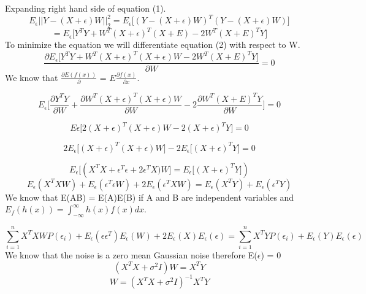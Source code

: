 \documentclass{article}
\begin{document}
Expanding right hand side of equation (1).
\begin{equation*}
 E_\epsilon || Y - (X+\epsilon)W||_2^2  = E_\epsilon \bigg[(Y - (X+\epsilon)W)^T(Y - (X+\epsilon)W)\bigg]
\end{equation*}
\begin{equation*}
= E_\epsilon \bigg[ Y^TY + W^T(X+\epsilon)^T(X+E) - 2W^T(X+E)^TY \bigg] \tag{2}
\end{equation*}
To minimize the equation we will differentiate equation (2) with respect to W.
\begin{equation*}
	\frac{\partial E_\epsilon \bigg[ Y^TY + W^T(X+\epsilon)^T(X+\epsilon)W - 2W^T(X+E)^TY \bigg]}{\partial W} = 0
\end{equation*}
We know that $\frac{\partial E(f(x))}{\partial}$  = $E\frac{\partial f(x)}{\partial x}$.

\begin{equation*}
	E_\epsilon \bigg[ \frac{\partial Y^TY}{\partial W } + \frac{\partial W^T(X+\epsilon)^T(X+\epsilon)W}{\partial W} -  2\frac{\partial W^T(X+E)^TY}{\partial W}\bigg] = 0
\end{equation*}

\begin{equation*}
	E\epsilon\big[ 2(X+\epsilon)^T(X+\epsilon)W -2(X+\epsilon)^TY\big] = 0
\end{equation*}

\begin{equation*}
	2E_\epsilon \big[(X+\epsilon)^T(X+\epsilon)W \big] -2 E_\epsilon \big[(X+\epsilon)^TY\big] = 0
\end{equation*}

\begin{equation*}
	E_\epsilon\big[(X^TX+\epsilon^T\epsilon +2\epsilon^TX\big)W] = E_\epsilon\big[(X+\epsilon)^TY\big])
\end{equation*}
\begin{equation*}
	E_\epsilon(X^TXW)+ E_\epsilon(\epsilon^T\epsilon W) + 2E_\epsilon(\epsilon^TX W) = E_\epsilon(X^TY) + E_\epsilon(\epsilon^TY)
\end{equation*}
We know that E(AB) = E(A)E(B) if A and B are independent variables and $E_f(h(x)) = \int_{-\infty}^{\infty}h(x)f(x)dx$.

\begin{equation*}
	\sum_{i=1}^{n}X^TXWP(\epsilon_i) + E_\epsilon(\epsilon\epsilon^T)E_\epsilon(W) +2E_\epsilon(X)E_\epsilon(\epsilon)  = \sum_{i=1}^{n} X^TYP(\epsilon_i) + E_\epsilon(Y)E_\epsilon(\epsilon)
\end{equation*}
We know that the noise is a zero mean Gaussian noise therefore E($\epsilon$) = 0
\begin{equation*}
	(X^TX + \sigma^2I)W = X^TY
\end{equation*}
\begin{equation*}
	W = (X^TX + \sigma^2I)^{-1}X^TY
\end{equation*}
\end{document}
